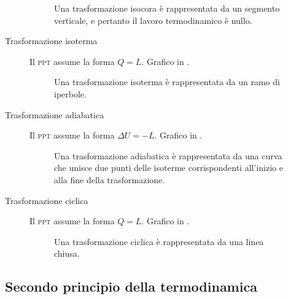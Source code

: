 \documentclass[a4paper,11pt,italian]{article}
\begin{document}
\begin{description}
\begin{figure}[htp]\centering

\caption{Una trasformazione isocora è rappresentata da un segmento verticale, e pertanto il lavoro termodinamico è nullo.}
\label{img:isocora}
\end{figure}

  \item[Trasformazione isoterma] 
  Il \textsc{ppt} assume la forma $ Q = L $. Grafico in .

\begin{figure}[htp]\centering

\caption{Una trasformazione isoterma è rappresentata da un ramo di iperbole.}
\label{img:isoterma}
\end{figure}

  \item[Trasformazione adiabatica] 
  Il \textsc{ppt} assume la forma $ \Delta U = - L $. Grafico in .

\begin{figure}[htp]\centering

\caption{Una trasformazione adiabatica è rappresentata da una curva che unisce due punti delle isoterme corrispondenti all'inizio e alla fine della trasformazione.}
\label{img:adiabatica}
\end{figure}

  \item[Trasformazione ciclica] 
  Il \textsc{ppt} assume la forma  $ Q = L $. Grafico in .

\begin{figure}[htp]\centering

\caption{Una trasformazione ciclica è rappresentata da una linea chiusa.}
\label{img:ciclica}
\end{figure}
\end{description}

\subsection{Secondo principio della termodinamica}
\end{document}
